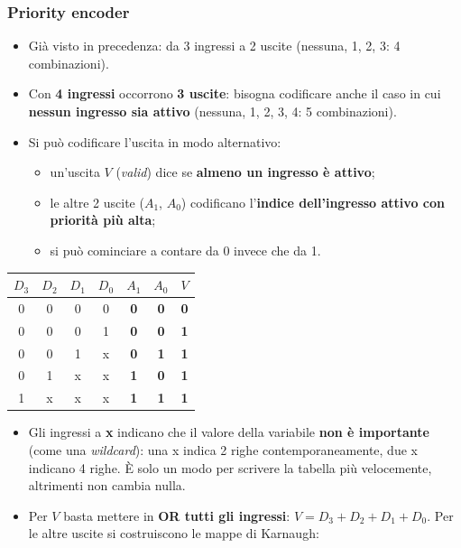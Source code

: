 \documentclass[12pt, a4paper]{article}
\begin{document}
\subsubsection{Priority encoder}
\begin{itemize}
    \item Già visto in precedenza: da 3 ingressi a 2 uscite (nessuna, 1, 2, 3: 4 combinazioni).
    \item Con \textbf{4 ingressi} occorrono \textbf{3 uscite}: bisogna codificare anche il caso in cui \textbf{nessun ingresso sia attivo} (nessuna, 1, 2, 3, 4: 5 combinazioni).
    \item Si può codificare l'uscita in modo alternativo:
    \begin{itemize}
        \item un'uscita $V$ (\emph{valid}) dice se \textbf{almeno un ingresso è attivo};
        \item le altre 2 uscite ($A_1$, $A_0$) codificano l'\textbf{indice dell'ingresso attivo con priorità più alta};
        \item si può cominciare a contare da 0 invece che da 1.
    \end{itemize}
\end{itemize}

\begin{center}
\renewcommand{\arraystretch}{1.25}
\begin{tabular}[t]{|cccc||ccc|}
\hline
\colorbox{gray!25}{\color{black}$D_3$} & \colorbox{gray!25}{\color{black}$D_2$} & \colorbox{gray!25}{\color{black}$D_1$} & \colorbox{gray!25}{\color{black}$D_0$} & \colorbox{gray!25}{\color{black}$A_1$} & \colorbox{gray!25}{\color{black}$A_0$} & \colorbox{gray!25}{\color{black}$V$} \\ \hline
0 & 0 & 0 & 0 & \textbf{0} & \textbf{0} & \textbf{0} \\ \hline
0 & 0 & 0 & 1 & \textbf{0} & \textbf{0} & \textbf{1} \\ \hline
0 & 0 & 1 & x & \textbf{0} & \textbf{1} & \textbf{1} \\ \hline
0 & 1 & x & x & \textbf{1} & \textbf{0} & \textbf{1} \\ \hline
1 & x & x & x & \textbf{1} & \textbf{1} & \textbf{1} \\ \hline
\end{tabular}
\end{center}

\begin{itemize}
    \item Gli ingressi a \textbf{x} indicano che il valore della variabile \textbf{non è importante} (come una \emph{wildcard}): una x indica 2 righe contemporaneamente, due x indicano 4 righe. È solo un modo per scrivere la tabella più velocemente, altrimenti non cambia nulla.
    \item Per $V$ basta mettere in \textbf{OR tutti gli ingressi}: $V = D_3 + D_2 + D_1 + D_0$. Per le altre uscite si costruiscono le mappe di Karnaugh:
\end{itemize}
\end{document}
